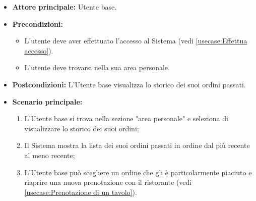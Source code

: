 \label{usecase:Storico ordini}
\begin{itemize}
	\item \textbf{Attore principale:} Utente base.

	\item \textbf{Precondizioni:}
	\begin{itemize}
        \item L'utente deve aver effettuato l'accesso al Sistema (vedi \autoref{usecase:Effettua accesso}).
        \item L'utente deve trovarsi nella sua area personale.
    \end{itemize}

	\item \textbf{Postcondizioni:} L'Utente base visualizza lo storico dei suoi ordini passati.

	\item \textbf{Scenario principale:}
	      \begin{enumerate}
		      \item L'Utente base si trova nella sezione "area personale" e seleziona di visualizzare lo storico dei suoi ordini;
		      \item Il Sistema mostra la lista dei suoi ordini passati in ordine dal più recente al meno recente;
              \item L'Utente base può scegliere un ordine che gli è particolarmente piaciuto e riaprire una nuova prenotazione con il ristorante (vedi \autoref{usecase:Prenotazione di un tavolo}).
	      \end{enumerate}
\end{itemize}

